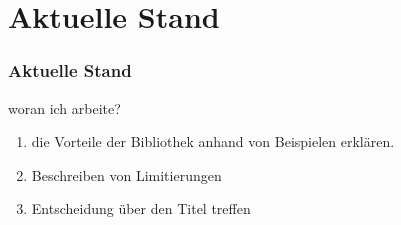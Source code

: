 

\section{Aktuelle Stand}

\begin{frame}{}
    \frametitle{Aktuelle Stand}

    \footnotesize

    \begin{alertblock}{woran ich arbeite?}
        \begin{enumerate}
            \item die Vorteile der Bibliothek anhand von Beispielen erklären.
            \item Beschreiben von Limitierungen
            \item Entscheidung über den Titel treffen
        \end{enumerate}
    \end{alertblock}


\end{frame}
